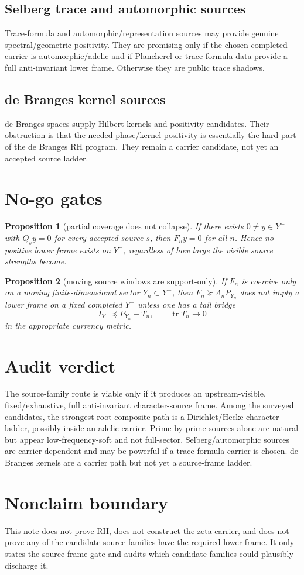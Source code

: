 \documentclass[11pt]{article}
\newtheorem{proposition}{Proposition}
\begin{document}
\subsection{Selberg trace and automorphic sources}
Trace-formula and automorphic/representation sources may provide genuine spectral/geometric positivity.  They are promising only if the chosen completed carrier is automorphic/adelic and if Plancherel or trace formula data provide a full anti-invariant lower frame.  Otherwise they are public trace shadows.

\subsection{de Branges kernel sources}
de Branges spaces supply Hilbert kernels and positivity candidates.  Their obstruction is that the needed phase/kernel positivity is essentially the hard part of the de Branges RH program.  They remain a carrier candidate, not yet an accepted source ladder.

\section{No-go gates}
\begin{proposition}[partial coverage does not collapse]
If there exists \(0\ne y\in Y^-\) with \(Q_sy=0\) for every accepted source \(s\), then \(F_ny=0\) for all \(n\).  Hence no positive lower frame exists on \(Y^-\), regardless of how large the visible source strengths become.
\end{proposition}

\begin{proposition}[moving source windows are support-only]
If \(F_n\) is coercive only on a moving finite-dimensional sector \(Y_n\subset Y^-\), then \(F_n\succeq \Lambda_n P_{Y_n}\) does not imply a lower frame on a fixed completed \(Y^-\) unless one has a tail bridge
\[
I_{Y^-}\preceq P_{Y_n}+T_n,\qquad \operatorname{tr}T_n\to0
\]
in the appropriate currency metric.
\end{proposition}

\section{Audit verdict}
The source-family route is viable only if it produces an upstream-visible, fixed/exhaustive, full anti-invariant character-source frame.  Among the surveyed candidates, the strongest root-composite path is a Dirichlet/Hecke character ladder, possibly inside an adelic carrier.  Prime-by-prime sources alone are natural but appear low-frequency-soft and not full-sector.  Selberg/automorphic sources are carrier-dependent and may be powerful if a trace-formula carrier is chosen.  de Branges kernels are a carrier path but not yet a source-frame ladder.

\section{Nonclaim boundary}
This note does not prove RH, does not construct the zeta carrier, and does not prove any of the candidate source families have the required lower frame.  It only states the source-frame gate and audits which candidate families could plausibly discharge it.
\end{document}
